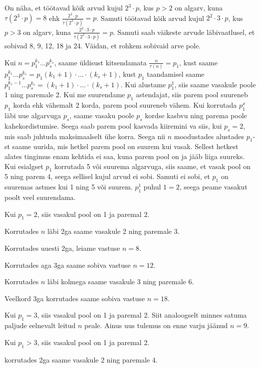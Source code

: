 \documentclass[a4paper, 10pt]{article}
\begin{document}
\bigskip
On näha, et töötavad kõik arvud kujul $2^3\cdot p$, kus $p>2$ on algarv, kuna $\tau(2^3\cdot p)=8$ ehk $\frac{2^3\cdot p}{\tau(2^3\cdot p)}=p$. Samuti töötavad kõik arvud kujul $2^2\cdot3\cdot p$, kus $p>3$ on algarv, kuna $\frac{2^2\cdot3\cdot p}{\tau(2^2\cdot3\cdot p)}=p$. Samuti saab väikeste arvude läbivaatlusel, et sobivad 8, 9, 12, 18 ja 24. Väidan, et rohkem sobivaid arve pole.

Kui $n=p_1^{k_1}...p_s^{k_s}$, saame üldisust kitsendamata $\frac{n}{\tau(n)}=p_1$, kust saame $p_1^{k_1}...p_s^{k_s}=p_1(k_1+1)\cdot...\cdot(k_s+1)$, kust $p_1$ taandamisel saame $p_1^{k_1-1} ... p_s^{k_s}=(k_1+1)\cdot...\cdot(k_s+1)$. Kui alustame $p_1^1$, siis saame vasakule poole 1 ning paremale 2. Kui me suurendame $p_1$ astendajat, siis parem pool suureneb $p_1$ korda ehk vähemalt 2 korda, parem pool suureneb vähem. Kui korrutada $p_1^x$ läbi uue algarvuga $p_s$, saame vasaku poole $p_s$ kordse kasbvu ning parema poole kahekordistumise. Seega saab parem pool kasvada kiiremini va siis, kui $p_s=2$, mis saab juhtuda maksimaalselt ühe korra. Seega nii $n$ moodustades alustades $p_1$-st saame uurida, mis hetkel parem pool on suurem kui vasak. Sellest hetkest alates tingimus enam kehtida ei saa, kuna parem pool on ja jääb liiga suureks. Kui esialgset $p_1$ korrutada 5 või suurema algarvuga, siis saame, et vasak pool on 5 ning parem 4, seega sellisel kujul arvud ei sobi. Samuti ei sobi, et $p_1$ on suuremas astmes kui 1 ning 5 või suurem. $p_1^1$ puhul $1=2$, seega peame vasakut poolt veel suurendama. 

Kui $p_1=2$, siis vasakul pool on 1 ja paremal 2. 

\quad Korrutades $n$ läbi 2ga saame vasakule 2 ning paremale 3. 

\quad\quad Korrutades uuesti 2ga, leiame vastuse $n=8$.

\quad\quad Korrutades aga 3ga saame sobiva vastuse $n=12$.

\quad Korrutades $n$ läbi kolmega saame vasakule 3 ning paremale 6.

\quad\quad Veelkord 3ga korrutades saame sobiva vastuse $n=18$.

Kui $p_1=3$, siis vasakul pool on 1 ja paremal 2. Siit analoogselt minnes satuma paljude eelnevalt leitud $n$ peale. Ainus uus tulemus on enne varju jäänud $n=9$.

Kui $p_1>3$, siis vasakul pool on 1 ja paremal 2. 

\quad korrutades 2ga saame vasakule 2 ning paremale 4.
\end{document}
